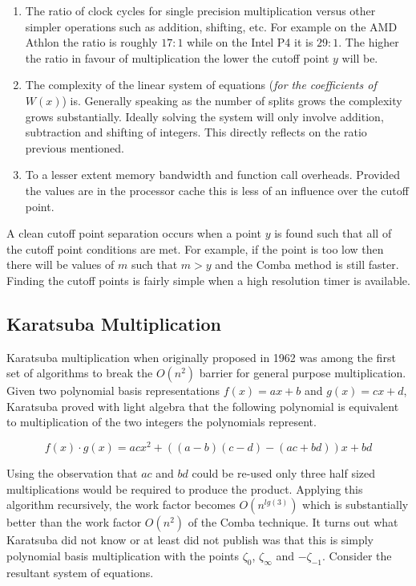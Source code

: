\documentclass[b5paper]{book}
\begin{document}
\begin{enumerate}
\item  The ratio of clock cycles for single precision multiplication versus other simpler operations such as addition, shifting, etc.  For example
on the AMD Athlon the ratio is roughly $17 : 1$ while on the Intel P4 it is $29 : 1$.  The higher the ratio in favour of multiplication the lower
the cutoff point $y$ will be.  

\item  The complexity of the linear system of equations (\textit{for the coefficients of $W(x)$}) is.  Generally speaking as the number of splits
grows the complexity grows substantially.  Ideally solving the system will only involve addition, subtraction and shifting of integers.  This
directly reflects on the ratio previous mentioned.

\item  To a lesser extent memory bandwidth and function call overheads.  Provided the values are in the processor cache this is less of an
influence over the cutoff point.

\end{enumerate}

A clean cutoff point separation occurs when a point $y$ is found such that all of the cutoff point conditions are met.  For example, if the point
is too low then there will be values of $m$ such that $m > y$ and the Comba method is still faster.  Finding the cutoff points is fairly simple when
a high resolution timer is available.  

\subsection{Karatsuba Multiplication}
Karatsuba \cite{KARA} multiplication when originally proposed in 1962 was among the first set of algorithms to break the $O(n^2)$ barrier for
general purpose multiplication.  Given two polynomial basis representations $f(x) = ax + b$ and $g(x) = cx + d$, Karatsuba proved with 
light algebra \cite{KARAP} that the following polynomial is equivalent to multiplication of the two integers the polynomials represent.

\begin{equation}
f(x) \cdot g(x) = acx^2 + ((a - b)(c - d) - (ac + bd))x + bd
\end{equation}

Using the observation that $ac$ and $bd$ could be re-used only three half sized multiplications would be required to produce the product.  Applying
this algorithm recursively, the work factor becomes $O(n^{lg(3)})$ which is substantially better than the work factor $O(n^2)$ of the Comba technique.  It turns 
out what Karatsuba did not know or at least did not publish was that this is simply polynomial basis multiplication with the points 
$\zeta_0$, $\zeta_{\infty}$ and $-\zeta_{-1}$.  Consider the resultant system of equations.
\end{document}
